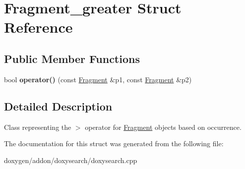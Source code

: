 \hypertarget{struct_fragment__greater}{}\section{Fragment\+\_\+greater Struct Reference}
\label{struct_fragment__greater}
\subsection*{Public Member Functions}
\begin{DoxyCompactItemize}
\item 
\mbox{\label{struct_fragment__greater_acc28c2dc8440558e68b00b5bc0936a2d}} 
bool {\bfseries operator()} (const \mbox{\hyperlink{struct_fragment}{Fragment}} \&p1, const \mbox{\hyperlink{struct_fragment}{Fragment}} \&p2)
\end{DoxyCompactItemize}


\subsection{Detailed Description}
Class representing the \textquotesingle{}$>$\textquotesingle{} operator for \mbox{\hyperlink{struct_fragment}{Fragment}} objects based on occurrence. 

The documentation for this struct was generated from the following file\+:\begin{DoxyCompactItemize}
\item 
doxygen/addon/doxysearch/doxysearch.\+cpp\end{DoxyCompactItemize}
